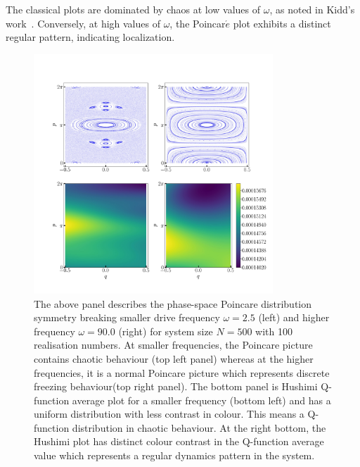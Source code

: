 \documentclass[%
reprint,
superscriptaddress,
amsmath,amssymb,
aps,
prb,
]{revtex4-2}
\begin{document}
	The classical plots are dominated by chaos at low values of $\omega$, as noted in Kidd's work~\cite{Kidd2019}. Conversely, at high values of $\omega$, the Poincar$\acute{e}$ plot exhibits a distinct regular pattern, indicating localization.
	\begin{figure}[ht!]
		\centering
		\includegraphics[height = 9.0cm, width = 9.0 cm]{lmg_poincare.jpeg}
		\caption{The above panel describes the phase-space Poincare distribution symmetry breaking smaller drive frequency $\omega = 2.5$ (left) and higher frequency $\omega = 90.0$ (right) for system size $N=500$ with 100 realisation numbers. At smaller frequencies, the Poincare picture contains chaotic behaviour (top left panel) whereas at the higher frequencies, it is a normal Poincare picture which represents discrete freezing behaviour(top right panel). The bottom panel is Hushimi Q-function average plot for  a smaller frequency (bottom left) and has a uniform distribution with less contrast in colour. This means a Q-function distribution in chaotic behaviour. At the right bottom, the Hushimi plot has distinct colour contrast in the Q-function average value which represents a regular dynamics pattern in the system.}
		\label{fig:classical_lipkin}
	\end{figure}
\end{document}
